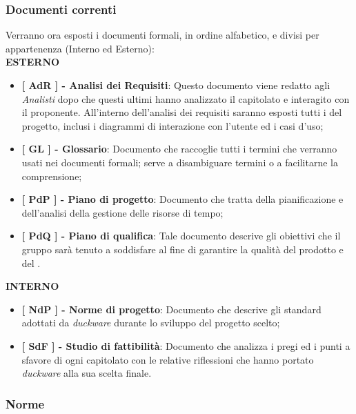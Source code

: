 \subsubsection{Documenti correnti}
Verranno ora esposti i documenti formali, in ordine alfabetico, e divisi per appartenenza (Interno ed Esterno):\\[0.5cm]
\textbf{ESTERNO}
\begin{itemize}
    \item \textbf{[ AdR ] - Analisi dei Requisiti}: Questo documento viene redatto agli \emph{Analisti} dopo che questi ultimi hanno analizzato il capitolato e interagito con il proponente. All’interno dell’analisi dei requisiti saranno esposti tutti i  del progetto, inclusi i diagrammi di interazione con l’utente ed i casi d’uso;
    \item \textbf{[ GL ] - Glossario}: Documento che raccoglie tutti i termini che verranno usati nei documenti formali; serve a disambiguare termini o a facilitarne la comprensione;
    \item \textbf{[ PdP ] - Piano di progetto}: Documento che tratta della pianificazione e dell’analisi della gestione delle risorse di tempo;
    \item \textbf{[ PdQ ] - Piano di qualifica}: Tale documento descrive gli obiettivi che il gruppo sarà tenuto a soddisfare al fine di garantire la qualità del prodotto e del .
\end{itemize}
\textbf{INTERNO}
\begin{itemize}
    \item \textbf{[ NdP ] - Norme di progetto}: Documento che descrive gli standard adottati da \emph{duckware} durante lo sviluppo del progetto scelto;
    \item \textbf{[ SdF ] - Studio di fattibilità}: Documento che analizza i pregi ed i punti a sfavore di ogni capitolato con le relative riflessioni che hanno portato \emph{duckware} alla sua scelta finale.

\end{itemize}

\subsubsection{Norme}
